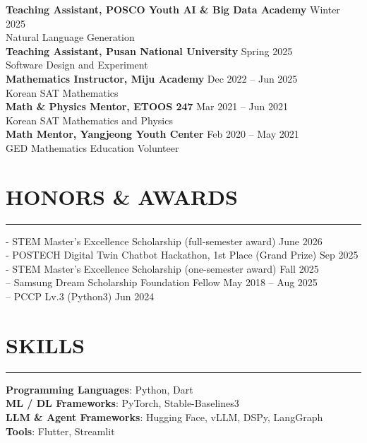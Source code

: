 \documentclass[11pt]{article}
\newcommand{\sectionline}{\vspace{-0.5ex}\noindent\rule{\textwidth}{0.4pt}\vspace{0.6ex}}
\begin{document}
\textbf{Teaching Assistant, POSCO Youth AI \& Big Data Academy} \hfill Winter 2025\\
Natural Language Generation \\
\textbf{Teaching Assistant, Pusan National University} \hfill Spring 2025\\
Software Design and Experiment \\
\textbf{Mathematics Instructor, Miju Academy} \hfill Dec 2022 -- Jun 2025\\
Korean SAT Mathematics \\
\textbf{Math \& Physics Mentor, ETOOS 247} \hfill Mar 2021 -- Jun 2021\\
Korean SAT Mathematics and Physics \\
\textbf{Math Mentor, Yangjeong Youth Center} \hfill Feb 2020 -- May 2021\\
GED Mathematics Education Volunteer

\vspace{10pt}
\section*{HONORS \& AWARDS}
\sectionline

- STEM Master’s Excellence Scholarship (full-semester award) \hfill June 2026\\
- POSTECH Digital Twin Chatbot Hackathon, 1st Place (Grand Prize) \hfill Sep 2025\\
- STEM Master’s Excellence Scholarship (one-semester award) \hfill Fall 2025\\
– Samsung Dream Scholarship Foundation Fellow \hfill May 2018 -- Aug 2025\\
– PCCP Lv.3 (Python3) \hfill Jun 2024\\

\section*{SKILLS}
\sectionline

\textbf{Programming Languages}: Python, Dart \\
\textbf{ML / DL Frameworks}: PyTorch, Stable-Baselines3 \\
\textbf{LLM \& Agent Frameworks}: Hugging Face, vLLM, DSPy, LangGraph \\
\textbf{Tools}: Flutter, Streamlit
\end{document}

